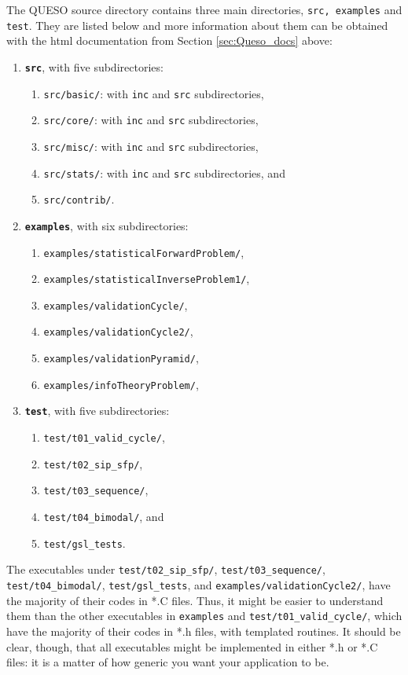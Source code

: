 The QUESO source directory contains three main directories, \texttt{src, examples} and \texttt{test}. They are listed below and more
information about them can be obtained with the html documentation from Section \ref{sec:Queso_docs} above:
\begin{enumerate}
\item \texttt{\bf src}, with five subdirectories:
\begin{enumerate}
\item \texttt{src/basic/}: with \texttt{inc} and \texttt{src} subdirectories,
\item \texttt{src/core/}:  with \texttt{inc} and \texttt{src} subdirectories,
\item \texttt{src/misc/}:  with \texttt{inc} and \texttt{src} subdirectories,
\item \texttt{src/stats/}: with \texttt{inc} and \texttt{src} subdirectories, and
\item \texttt{src/contrib/}.
\end{enumerate}

\item \texttt{\bf examples}, with six subdirectories:
\begin{enumerate}
\item \texttt{examples/statisticalForwardProblem/},
\item \texttt{examples/statisticalInverseProblem1/},
\item \texttt{examples/validationCycle/}, 
\item \texttt{examples/validationCycle2/},
\item \texttt{examples/validationPyramid/},
\item \texttt{examples/infoTheoryProblem/},
\end{enumerate}

\item  \texttt{\bf test}, with five subdirectories:
\begin{enumerate}
\item \texttt{test/t01\_valid\_cycle/},
\item \texttt{test/t02\_sip\_sfp/},
\item \texttt{test/t03\_sequence/}, 
\item \texttt{test/t04\_bimodal/}, and
\item \texttt{test/gsl\_tests}.
\end{enumerate}

\end{enumerate}


The executables under \texttt{test/t02\_sip\_sfp/},  \texttt{test/t03\_sequence/}, \texttt{test/t04\_bimodal/},   \texttt{test/gsl\_tests}, and \texttt{examples/validationCycle2/}, have the majority of their codes in *.C files.
Thus, it might be easier to understand them than the other executables in  \texttt{examples} and \texttt{test/t01\_valid\_cycle/}, which
have the majority of their codes in *.h files, with templated routines.
It should be clear, though, that all executables might be implemented in either *.h or *.C files: it is a matter of how generic you want your application to be.


